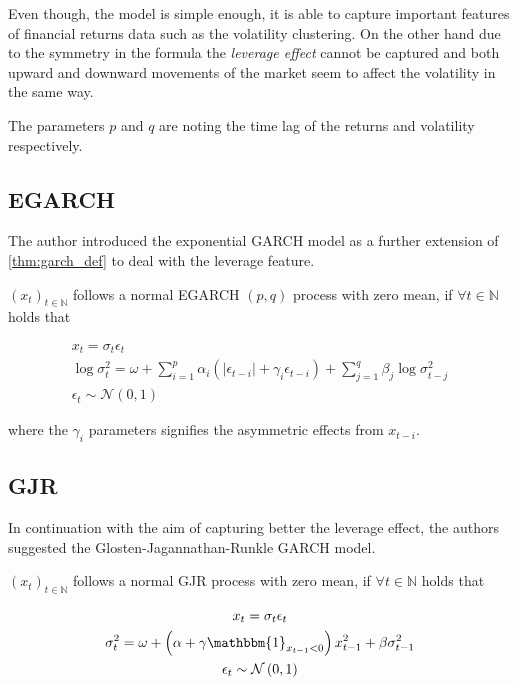 \documentclass[a4paper, oneside]{discothesis}
\begin{document}
Even though, the model is simple enough, it is able to capture important features of financial returns data such as the volatility clustering. On the other hand due to the symmetry in the formula the \textit{leverage effect} cannot be captured and both upward and downward movements of the market seem to affect the volatility in the same way.

The parameters $p$ and $q$ are noting the time lag of the returns and volatility respectively.

\subsection{EGARCH}

The author \cite{egarch} introduced the exponential GARCH model as a further extension of \ref{thm:garch_def}  to deal with the leverage feature.

\begin{definition}\label{thm:egarch_def} $\left(x_t\right)_{t\in \mathbb{N}}$ follows a normal EGARCH $\left(p, q\right)$ process with zero mean, if $\forall t \in \mathbb{N}$ holds that

\begin{gather*}\label{eq:}
x_t = \sigma_t \epsilon_t \\
\log\sigma^2_t = \omega + \sum_{i=1}^p\alpha_i \left(|\epsilon_{t-i}|+\gamma_i\epsilon_{t-i}\right) + \sum_{j=1}^q \beta_j \log \sigma_{t-j}^2  \\
\epsilon_t \sim \mathcal{N}\left(0,1\right)
\end{gather*}

\end{definition}
where the $\gamma_i$ parameters signifies the asymmetric effects from $x_{t-i}$. 

\subsection{GJR}

In continuation with the aim of capturing better the leverage effect, the authors \cite{gjr} suggested the Glosten-Jagannathan-Runkle GARCH model. 

\begin{definition}[GJR]\label{thm:gjr} 
$\left(x_t\right)_{t\in \mathbb{N}}$ follows a normal GJR process with zero mean, if $\forall t \in \mathbb{N}$ holds that

\begin{gather*}\label{eq:}
x_t = \sigma_t \epsilon_t \\
\sigma^2_t = \omega + \left(\alpha+\gamma \mathbbm{1}_{x_{t-1}<0}\right)x_{t-1}^2+\beta \sigma_{t-1}^2 \\
\epsilon_t \sim \mathcal{N}\left(0,1\right)
\end{gather*}
\end{definition}
\end{document}
